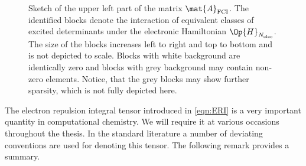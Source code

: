 \begin{figure}
	\centering
	\caption[Sketch of the the \FCI matrix]{
		Sketch of the upper left part of the \FCI matrix $\mat{A}_\text{FCI}$.
		The identified blocks denote the
		interaction of equivalent classes of excited determinants
		under the electronic Hamiltonian $\Op{H}_{\Nelec}$.
		The size of the blocks increases left to right and top to bottom
		and is not depicted to scale.
		Blocks with white background are identically zero
		and blocks with grey background may contain non-zero elements.
		Notice, that the grey blocks may show further
		sparsity, which is not fully depicted here.
	}
	\label{fig:StructureFCIMatrix}
\end{figure}

The electron repulsion integral tensor introduced in \eqref{eqn:ERI}
is a very important quantity in computational chemistry.
We will require it at various occasions throughout the thesis.
In the standard literature a number of deviating conventions are used
for denoting this tensor. The following remark provides a summary.

